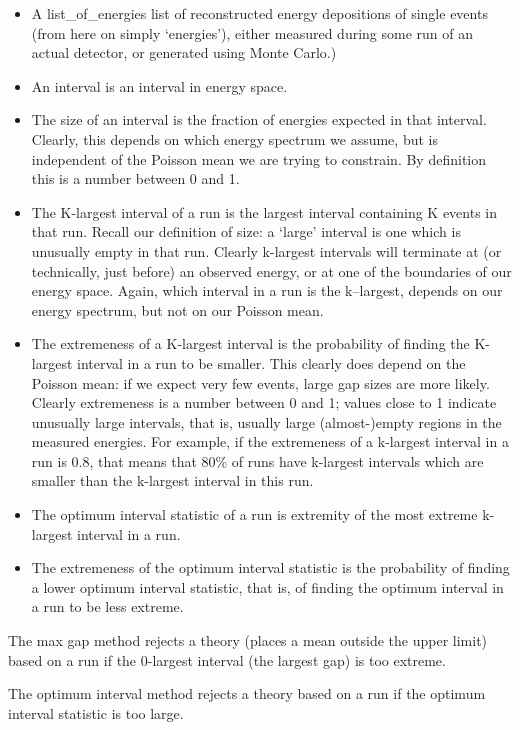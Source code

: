 \documentclass[letterpaper,10pt,english]{/opt/local/Library/Frameworks/Python.framework/Versions/3.3/lib/python3.3/site-packages/Sphinx-1.2.1-py3.3.egg/sphinx/texinputs/sphinxhowto}
\begin{document}
\begin{itemize}
\itemsep1pt\parskip0pt
\item
  A list\_of\_energies list of reconstructed energy depositions of
  single events (from here on simply `energies'), either measured during
  some run of an actual detector, or generated using Monte Carlo.)
\item
  An interval is an interval in energy space.
\item
  The size of an interval is the fraction of energies expected in that
  interval. Clearly, this depends on which energy spectrum we assume,
  but is independent of the Poisson mean we are trying to constrain. By
  definition this is a number between 0 and 1.
\item
  The K-largest interval of a run is the largest interval containing K
  events in that run. Recall our definition of size: a `large' interval
  is one which is unusually empty in that run. Clearly k-largest
  intervals will terminate at (or technically, just before) an observed
  energy, or at one of the boundaries of our energy space. Again, which
  interval in a run is the k--largest, depends on our energy spectrum,
  but not on our Poisson mean.
\item
  The extremeness of a K-largest interval is the probability of finding
  the K-largest interval in a run to be smaller. This clearly does
  depend on the Poisson mean: if we expect very few events, large gap
  sizes are more likely. Clearly extremeness is a number between 0 and
  1; values close to 1 indicate unusually large intervals, that is,
  usually large (almost-)empty regions in the measured energies. For
  example, if the extremeness of a k-largest interval in a run is 0.8,
  that means that 80\% of runs have k-largest intervals which are
  smaller than the k-largest interval in this run.
\item
  The optimum interval statistic of a run is extremity of the most
  extreme k-largest interval in a run.
\item
  The extremeness of the optimum interval statistic is the probability
  of finding a lower optimum interval statistic, that is, of finding the
  optimum interval in a run to be less extreme.
\end{itemize}

The max gap method rejects a theory (places a mean outside the upper
limit) based on a run if the 0-largest interval (the largest gap) is too
extreme.

The optimum interval method rejects a theory based on a run if the
optimum interval statistic is too large.
\end{document}

